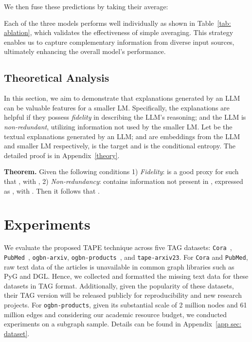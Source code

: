 \documentclass{article}
\begin{document}
We then fuse these predictions by taking their average:


Each of the three models performs well individually as shown in Table~\ref{tab: ablation}, which validates the effectiveness of simple averaging. This strategy enables us to capture complementary information from diverse input sources, ultimately enhancing the overall model's performance.

\subsection{Theoretical Analysis}\label{subsec: theorm}
In this section, we aim to demonstrate that explanations generated by an LLM can be valuable features for a smaller LM. Specifically, the explanations  are helpful if they possess \emph{fidelity} in describing the LLM's reasoning; and the LLM is \emph{non-redundant}, utilizing information not used by the smaller LM. Let  be the textual explanations generated by an LLM;  and  are embeddings from the LLM and smaller LM respectively,  is the target and  is the conditional entropy. The detailed proof is in Appendix~\ref{theory}. 

\textbf{Theorem. }Given the following conditions 1) \emph{Fidelity}:  is a good proxy for  such that , with ,  2) \emph{Non-redundancy}:  contains information not present in , expressed as , with . Then it follows that .

\section{Experiments}

We evaluate the proposed TAPE technique across five TAG datasets: \texttt{Cora}~\citep{mccallum2000automating_cora}, \texttt{PubMed}~\citep{sen2008collective_pubmed}, \texttt{ogbn-arxiv}, \texttt{ogbn-products}~\citep{hu2020open}, and \texttt{tape-arxiv23}. 
For \texttt{Cora} and \texttt{PubMed}, raw text data of the articles is unavailable in common graph libraries such as PyG and DGL. Hence, we  collected and formatted the missing text data for these datasets in TAG format. Additionally, given the popularity of these datasets, their TAG version will be released publicly for reproducibility and new research projects.  For \texttt{ogbn-products}, given its substantial scale of 2 million nodes and 61 million edges and considering our academic resource budget, we conducted experiments on a subgraph sample. Details can be found in Appendix~\ref{app sec: dataset}.
\end{document}
